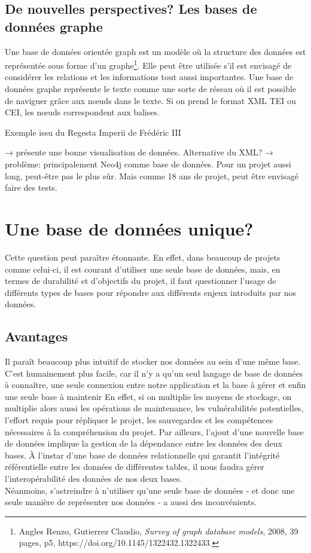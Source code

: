     
    \subsection{De nouvelles perspectives? Les bases de données graphe}


Une base de données orientée graph est un modèle où la structure des données est représentée sous forme d’un graphe\footnote{Angles Renzo, Gutierrez Claudio, \textit{Survey of graph database models}, 2008, 39 pages, p5, https://doi.org/10.1145/1322432.1322433.}. Elle peut être utilisée s’il est envisagé de considérer les relations et les informations tout aussi importantes. Une base de données graphe représente le texte comme une sorte de réseau où il est possible de naviguer grâce aux nœuds dans le texte. Si on prend le format XML TEI ou CEI, les nœuds correspondent aux balises.

Exemple issu du Regesta Imperii de Frédéric III

→ présente une bonne visualisation de données. Alternative du XML?
→ problème: principalement  Neo4j comme base de données. Pour un projet aussi long, peut-être pas le plus sûr. Mais comme 18 ans de projet, peut être envisagé faire des tests.


    \section{Une base de données unique?}

Cette question peut paraître étonnante. En effet, dans beaucoup de projets comme celui-ci, il est courant d’utiliser une seule base de données, mais, en termes de durabilité et d’objectifs du projet, il faut questionner l’usage de différents types de bases pour répondre aux différents enjeux introduits par nos données. 


    \subsection{Avantages}

Il paraît beaucoup plus intuitif de stocker nos données au sein d'une même base. C’est humainement plus facile, car il n’y a qu’un seul langage de base de données à connaître, une seule connexion entre notre application et la base à gérer et enfin une seule base à maintenir  En effet, si on multiplie les moyens de stockage, on multiplie alors aussi les opérations de maintenance, les vulnérabilités potentielles, l’effort requis pour répliquer le projet, les sauvegardes et les compétences nécessaires à la compréhension du projet. 
Par ailleurs, l’ajout d’une nouvelle base de données implique la gestion de la dépendance entre les données des deux bases. À l’instar d’une base de données relationnelle qui garantit l’intégrité référentielle entre les données de différentes tables, il nous faudra gérer l’interopérabilité des données de nos deux bases.\\
Néanmoins, s’astreindre à n’utiliser qu’une seule base de données - et donc une seule manière de représenter nos données - a aussi des inconvénients.
    
